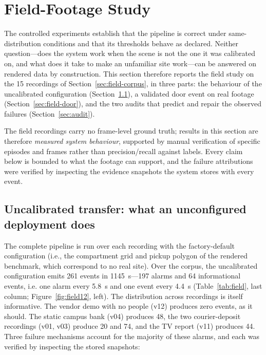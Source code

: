 \documentclass[journal,article,submit,oneauthor]{Definitions/mdpi}
\begin{document}
\section{Field-Footage Study}
\label{sec:field}

The controlled experiments establish that the pipeline is correct under same-distribution
conditions and that its thresholds behave as declared. Neither question---does the system
work when the scene is not the one it was calibrated on, and what does it take to make an
unfamiliar site work---can be answered on rendered data by construction. This section
therefore reports the field study on the 15 recordings of Section~\ref{sec:field-corpus},
in three parts: the behaviour of the uncalibrated configuration (Section~\ref{sec:field-transfer}),
a validated door event on real footage (Section~\ref{sec:field-door}), and the two audits
that predict and repair the observed failures (Section~\ref{sec:audit}).

The field recordings carry no frame-level ground truth; results in this section are
therefore \emph{measured system behaviour}, supported by manual verification of specific
episodes and frames rather than precision/recall against labels. Every claim below is bounded to what the footage can
support, and the failure attributions were verified by inspecting the evidence snapshots
the system stores with every event.

\subsection{Uncalibrated transfer: what an unconfigured deployment does}
\label{sec:field-transfer}
The complete pipeline is run over each recording with the factory-default configuration
(i.e., the compartment grid and pickup polygon of the rendered benchmark, which correspond
to no real site). Over the corpus, the uncalibrated configuration emits 261 events in
1145~s---197 alarms and 64 informational events, i.e. one alarm every 5.8~s and one event
every 4.4~s (Table~\ref{tab:field}, last column;
Figure~\ref{fig:field12}, left). The distribution across recordings is itself informative.
The vendor demo with no people (v12) produces zero events, as it should. The static campus
bank (v04) produces 48, the two courier-deposit recordings (v01, v03) produce 20 and 74,
and the TV report (v11) produces 44. Three failure mechanisms account for the majority of
these alarms, and each was verified by inspecting the stored snapshots:
\end{document}
